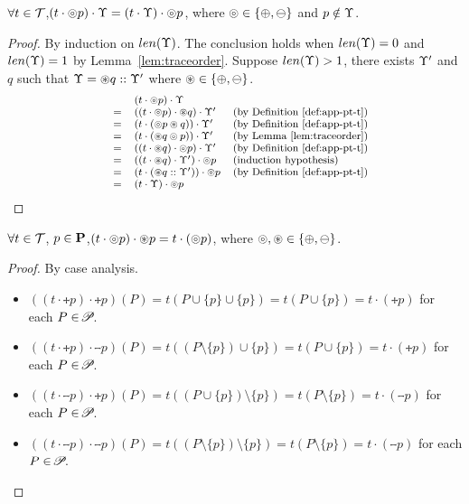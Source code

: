{{{\begin{lemma}\label{lem:traceorder-whole}
$\forall t\in\mathcal{T}$,$(t\cdot \circledcirc p )\cdot \Upsilon = (t\cdot\Upsilon)\cdot \circledcirc p$, where $\circledcirc \in\{\oplus , \ominus \}$ and $p \notin \Upsilon$.
\end{lemma}
\begin{proof}
By induction on $len(\Upsilon)$. The conclusion holds when $len(\Upsilon)=0$ and $len(\Upsilon)=1$ by Lemma~\ref{lem:traceorder}. Suppose $len(\Upsilon)>1$, there exists $\Upsilon'$ and $q$ such that $\Upsilon=\circledast q :: \Upsilon'$ where $\circledast \in\{\oplus , \ominus \}$.
\begin{equation*}\footnotesize
\begin{array}{lcll}
&&(t\cdot\circledcirc p)\cdot \Upsilon &\\
&=& ((t\cdot \circledcirc  p)  \cdot \circledast  q) \cdot \Upsilon'&\text{(by Definition~\ref{def:app-pt-t})}\\
              &=& (t\cdot(\circledcirc  p\circledast  q )) \cdot \Upsilon' &\text{(by Definition~\ref{def:app-pt-t})}\\
              &=& (t\cdot(\circledast  q \circledcirc  p)) \cdot \Upsilon' &\text{(by Lemma \ref{lem:traceorder})}\\
              &=& ((t\cdot\circledast  q) \cdot \circledcirc  p) \cdot \Upsilon' &\text{(by Definition~\ref{def:app-pt-t})}\\
              &=& ((t\cdot\circledast  q) \cdot \Upsilon') \cdot \circledcirc  p  & \text{(induction hypothesis)}\\
              &=& (t\cdot (\circledast  q :: \Upsilon')) \cdot \circledcirc  p &\text{(by Definition~\ref{def:app-pt-t})}\\
              &=& (t\cdot \Upsilon) \cdot \circledcirc p & \text{}
\end{array}
\end{equation*}
\end{proof}

\begin{lemma}\label{lem:tracepsame}
$\forall t\in\mathcal{T}$, $p\in\mathbf{P}$,$(t \cdot \circledcirc  p)\cdot\circledast  p =  t \cdot (\circledcirc  p) $, where $\circledcirc , \circledast  \in \{\oplus ,\ominus \}$.
\end{lemma}
\begin{proof}
By case analysis.
{\myeqsize
\begin{itemize}
\item $((t\cdot \tplus{ p})\cdot \tplus{ p})(P)=t(P\cup\{p\}\cup\{p\})  = t(P\cup\{p\}) =t\cdot(\tplus{ p})$ for each $P\in\!\mathscr{P}\!$.
\item $((t\cdot \tplus{ p})\cdot \tminus{ p})(P)=t((P\setminus\{p\})\cup\{p\})  = t(P\cup\{p\}) =t\cdot(\tplus{ p})$ for each $P\in\!\mathscr{P}\!$.
\item $((t\cdot \tminus{ p})\cdot \tplus{ p})(P) = t((P\cup\{p\})\setminus\{p\})=t(P\setminus\{p\})=t\cdot(\tminus{ p})$ for each $P\in\!\mathscr{P}\!$.
\item $((t\cdot \tminus{ p})\cdot \tminus{ p})(P) = t((P\setminus\{p\})\setminus\{p\})=t(P\setminus\{p\})=t\cdot(\tminus{ p})$ for each $P\in\!\mathscr{P}\!$.
\end{itemize}
}
\end{proof}

}}}
